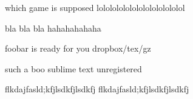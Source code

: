\documentclass[
	14pt,
	a4paper,
	]
	{scrartcl}
\begin{document}
\shapk
{}
\setcounter{zad}{0}

\vfill
\z which game is supposed
 \vfill
\z lololololololololololololol \vfill

\vfill

\newpage


\shapk
{}
\setcounter{zad}{0}

\vfill
\z bla bla bla
 \vfill
\z hahahahahaha
 \vfill

\vfill

\newpage


\shapk
{}
\setcounter{zad}{0}

\vfill
\z foobar is ready for you
 \vfill
\z dropbox/tex/gz
 \vfill

\vfill

\newpage


\shapk
{}
\setcounter{zad}{0}

\vfill
\z such a boo
 \vfill
\z sublime text unregistered
 \vfill

\vfill

\newpage


\shapk
{}
\setcounter{zad}{0}

\vfill
\z flkdajfasld;kfjlsdkfjlsdkfj
 \vfill
\z flkdajfasld;kfjlsdkfjlsdkfj
 \vfill

\vfill

\newpage
\end{document}
